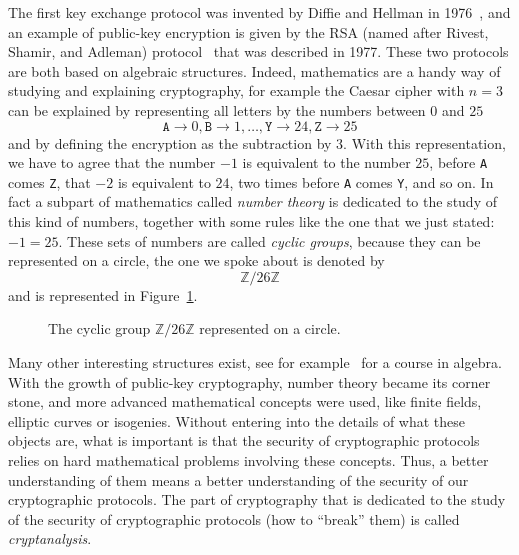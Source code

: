 The first key exchange protocol was invented by Diffie and Hellman in
1976~\cite{DH76}, and an example of public-key encryption is given by the RSA
(named after Rivest, Shamir, and Adleman) protocol~\cite{RSA78} that was
described in 1977. These two protocols are both based on algebraic
structures. Indeed, mathematics are a handy way of studying and explaining
cryptography, for example the Caesar cipher with $n=3$ can be explained by
representing all letters by the numbers between $0$ and $25$
\[
  \texttt{A}\to 0, \texttt{B} \to 1, \dots,\texttt{Y}\to24, \texttt{Z}\to25
\]
and by defining the encryption as the subtraction by $3$. With this
representation, we have to agree that the number $-1$ is equivalent to the
number $25$, \ie before \texttt{A} comes \texttt{Z}, that $-2$ is equivalent to
$24$, \ie two times before \texttt{A} comes \texttt{Y}, and so on. In fact a
subpart of mathematics called \emph{number theory} is dedicated to the study of
this kind of numbers, together with some rules like the one that we just stated:
$-1=25$. These sets of numbers are called \emph{cyclic groups}, because they can
be represented on a circle, the one we spoke about is denoted by
\[
  \mathbb{Z}/26\mathbb{Z}
\]
and is represented in Figure~\ref{fig:cyclic-group}.
\begin{figure}[h]
  \centering
  \caption{The cyclic group $\mathbb{Z}/26\mathbb{Z}$ represented on a circle.}
  \label{fig:cyclic-group}
\end{figure}
Many other interesting structures exist, see for example~\cite{Lang04, Perrin96}
for a course in algebra. With the growth of public-key cryptography, number
theory became its corner stone, and more advanced mathematical concepts were
used, like finite fields, elliptic curves or isogenies. Without entering into
the details of what these objects are, what is important is that the security of
cryptographic protocols relies on hard mathematical problems involving these
concepts. Thus, a better understanding of them means a better understanding of
the security of our cryptographic protocols. The part of cryptography that is
dedicated to the study of the security of cryptographic protocols (\ie how to
``break'' them) is called \emph{cryptanalysis}.

